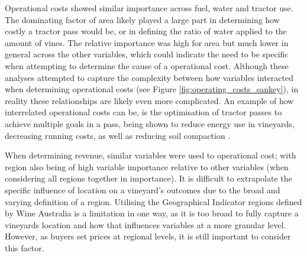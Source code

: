 \documentclass[review,12pt,authoryear]{elsarticle}
\begin{document}
\begin{linenumbers}
\par
Operational costs showed similar importance across fuel, water and tractor use. The dominating factor of area likely played a large part in determining how costly a tractor pass would be, or in defining the ratio of water applied to the amount of vines. The relative importance was high for area but much lower in general across the other variables, which could indicate the need to be specific when attempting to determine the cause of a operational cost. Although these analyses attempted to capture the complexity between how variables interacted when determining operational costs (see Figure \ref{fig:operating_costs_sankey}), in reality these relationships are likely even more complicated. An example of how interrelated operational costs can be, is 
the optimisation of tractor passes to achieve multiple goals in a pass, being shown to reduce energy use in vineyards, decreasing running costs, as well as reducing soil compaction \citep{capelloEffectsTractorPasses2019}. 
\par
When determining revenue, similar variables were used to operational cost; with region also being of high variable importance relative to other variables (when considering all regions together in importance). It is difficult to extrapolate the specific influence of location on a vineyard's outcomes due to the broad and varying definition of a region. Utilising the Geographical Indicator regions defined by Wine Australia \citep{wineaustraliaWineAustraliaOpenData2021} is a limitation in one way, as it is too broad to fully capture a vineyards location and how that influences variables at a more granular level. However, as buyers set prices at regional levels, it is still important to consider this factor. 
\par

\end{linenumbers}
\end{document}
